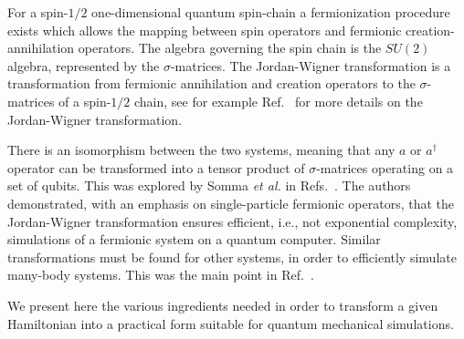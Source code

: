 For a spin-$1/2$ one-dimensional quantum spin-chain a fermionization
procedure exists 
which allows the mapping between spin operators and fermionic
creation-annihilation operators.
The algebra governing the spin chain is the $SU(2)$ algebra, represented by
the $\sigma$-matrices. The Jordan-Wigner transformation is a
transformation from fermionic annihilation and creation operators to
the $\sigma$-matrices of a spin-$1/2$ chain, see
for example Ref.~\cite{dargis1998} for more details on the Jordan-Wigner
transformation. 

There is an isomorphism 
between the two systems, meaning that any $a$ or $a^\dag$ operator can be
transformed into a tensor product of $\sigma$-matrices operating on a
set of qubits. This was explored by Somma {\em et al.} in Refs.~\cite{somma2002,ortiz2002}.  
The authors demonstrated, with an emphasis on single-particle fermionic operators,  
that the Jordan-Wigner transformation
ensures efficient, i.e., not exponential complexity, simulations of a
fermionic system on a quantum computer. 
Similar transformations must be found for other systems, in order to
efficiently simulate many-body systems. This was the main
point in Ref.~\cite{somma2002}. 

We present here the various ingredients needed in order to transform a given 
Hamiltonian into a practical form suitable  for quantum mechanical simulations. 

